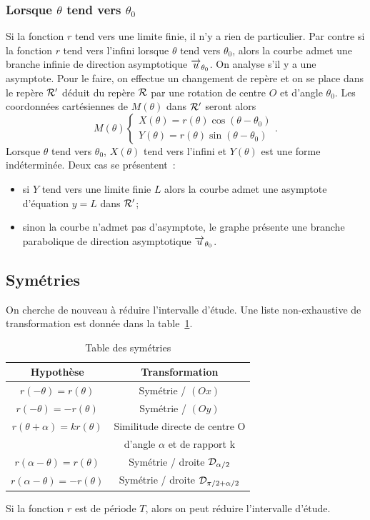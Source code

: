 \subsubsection{Lorsque $\theta$ tend vers $\theta_0$}
Si la fonction $r$ tend vers une limite finie, il n'y a rien de particulier. Par contre si la fonction $r$ tend vers l'infini lorsque $\theta$ tend vers $\theta_0$, alors la courbe admet une branche infinie de direction asymptotique $\overrightarrow{u}_{\theta_0}$. On analyse s'il y a une asymptote. Pour le faire, on effectue un changement de repère et on se place dans le repère $\mathcal{R}'$ déduit du repère $\mathcal{R}$ par une rotation de centre $O$ et d'angle $\theta_0$. Les coordonnées cartésiennes de $M(\theta)$ dans $\mathcal{R}'$ seront alors
\begin{equation}
  M(\theta)
  \begin{cases}
    X(\theta)=r(\theta)\cos(\theta-\theta_0)\\
    Y(\theta)=r(\theta)\sin(\theta-\theta_0)
  \end{cases}.
\end{equation}
Lorsque $\theta$ tend vers $\theta_0$, $X(\theta)$ tend vers l'infini et $Y(\theta)$ est une forme indéterminée. Deux cas se présentent~:
\begin{itemize}
\item si $Y$ tend vers une limite finie $L$ alors la courbe admet une asymptote d'équation $y=L$ dans $\mathcal{R}'$;
\item sinon la courbe n'admet pas d'asymptote, le graphe présente une branche parabolique de direction asymptotique $\overrightarrow{u}_{\theta_0}$.
\end{itemize}

\subsection{Symétries}
On cherche de nouveau à réduire l'intervalle d'étude. Une liste non-exhaustive de transformation est donnée dans la table~\ref{tab:sympol}.
\begin{table}
  \centering
  \begin{tabular}{|c|c|}\hline
    Hypothèse & Transformation \\ \hline
    $r(-\theta)=r(\theta)$ & Symétrie / $(Ox)$ \\ \hline
    $r(-\theta)=-r(\theta)$ & Symétrie / $(Oy)$ \\ \hline
    $r(\theta+\alpha)=kr(\theta)$ & Similitude directe de centre O \\ & d'angle $\alpha$ et de rapport k \\ \hline
    $r(\alpha-\theta)=r(\theta)$ & Symétrie / droite $\mathcal{D}_{\alpha/2}$ \\ \hline
    $r(\alpha-\theta)=-r(\theta)$ & Symétrie / droite $\mathcal{D}_{\pi/2 + \alpha/2}$ \\ \hline
 \end{tabular}
 \caption{Table des symétries}
 \label{tab:sympol}
\end{table}
Si la fonction $r$ est de période $T$, alors on peut réduire l'intervalle d'étude.
